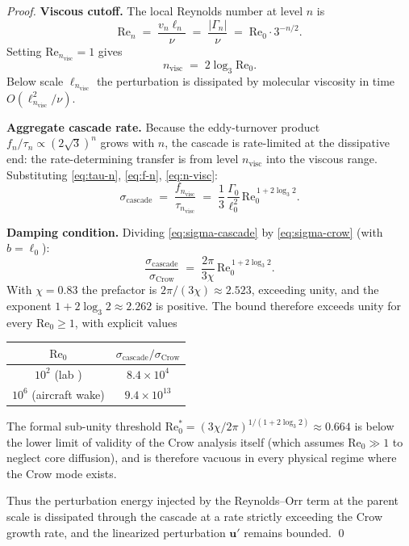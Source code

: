 \begin{proof}
\noindent\textbf{Viscous cutoff.} The local Reynolds number at level $n$ is
\begin{equation}
\mathrm{Re}_n \;=\; \frac{v_n \ell_n}{\nu} \;=\; \frac{|\Gamma_n|}{\nu} \;=\; \mathrm{Re}_0 \cdot 3^{-n/2}.
\end{equation}
Setting $\mathrm{Re}_{n_{\mathrm{visc}}} = 1$ gives
\begin{equation}\label{eq:n-visc}
n_{\mathrm{visc}} \;=\; 2\log_3 \mathrm{Re}_0.
\end{equation}
Below scale $\ell_{n_{\mathrm{visc}}}$ the perturbation is dissipated by molecular viscosity in time $O(\ell_{n_{\mathrm{visc}}}^2/\nu)$.

\noindent\textbf{Aggregate cascade rate.} Because the eddy-turnover product $f_n / \tau_n \propto (2\sqrt{3})^n$ grows with $n$, the cascade is rate-limited at the dissipative end\cite{kerswell2002elliptical}: the rate-determining transfer is from level $n_{\mathrm{visc}}$ into the viscous range. Substituting \eqref{eq:tau-n}, \eqref{eq:f-n}, \eqref{eq:n-visc}:
\begin{equation}\label{eq:sigma-cascade}
\sigma_{\mathrm{cascade}} \;=\; \frac{f_{n_{\mathrm{visc}}}}{\tau_{n_{\mathrm{visc}}}}
\;=\; \frac{1}{3}\,\frac{\Gamma_0}{\ell_0^2}\,\mathrm{Re}_0^{\,1+2\log_3 2}.
\end{equation}

\noindent\textbf{Damping condition.} Dividing \eqref{eq:sigma-cascade} by \eqref{eq:sigma-crow} (with $b = \ell_0$):
\begin{equation}
\frac{\sigma_{\mathrm{cascade}}}{\sigma_{\mathrm{Crow}}} \;=\; \frac{2\pi}{3\chi}\,\mathrm{Re}_0^{\,1+2\log_3 2}.
\end{equation}
With $\chi = 0.83$ the prefactor is $2\pi/(3\chi) \approx 2.523$, exceeding unity, and the exponent $1+2\log_3 2 \approx 2.262$ is positive. The bound therefore exceeds unity for every $\mathrm{Re}_0 \ge 1$, with explicit values
\begin{center}
\begin{tabular}{cc}\toprule
$\mathrm{Re}_0$ & $\sigma_{\mathrm{cascade}}/\sigma_{\mathrm{Crow}}$ \\\midrule
$10^2$ (lab \cite{leweke1998cooperative}) & $8.4 \times 10^4$ \\
$10^6$ (aircraft wake) & $9.4 \times 10^{13}$ \\
\bottomrule\end{tabular}
\end{center}
The formal sub-unity threshold $\mathrm{Re}_0^* = (3\chi/2\pi)^{1/(1+2\log_3 2)} \approx 0.664$ is below the lower limit of validity of the Crow analysis itself (which assumes $\mathrm{Re}_0 \gg 1$ to neglect core diffusion), and is therefore vacuous in every physical regime where the Crow mode exists.

Thus the perturbation energy injected by the Reynolds--Orr term at the parent scale is dissipated through the cascade at a rate strictly exceeding the Crow growth rate, and the linearized perturbation $\mathbf{u}'$ remains bounded. \qed
\end{proof}

